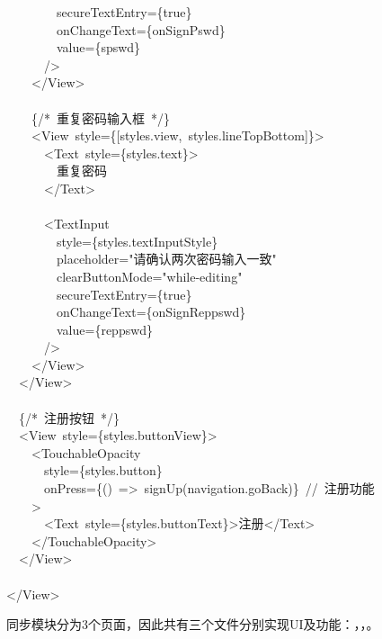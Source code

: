 \documentclass{article}
\begin{document}
\begin{mdpre}
~~~~~~~~secureTextEntry=\{{true}\}\\
~~~~~~~~onChangeText=\{onSignPswd\}\\
~~~~~~~~value=\{spswd\}\\
~~~~~~/\textgreater{}\\
~~~~\textless{}/View\textgreater{}\\
\\
~~~~\{{/*}{~重复密码输入框~}{*/}\}\\
~~~~\textless{}View~style=\{{}[styles.view,~styles.lineTopBottom]\}\textgreater{}\\
~~~~~~\textless{}Text~style=\{styles.text\}\textgreater{}\\
~~~~~~~~重复密码\\
~~~~~~\textless{}/Text\textgreater{}\\
\\
~~~~~~\textless{}TextInput\\
~~~~~~~~style=\{styles.textInputStyle\}\\
~~~~~~~~placeholder={"}{请确认两次密码输入一致}{"}\\
~~~~~~~~clearButtonMode={"}{while-editing}{"}\\
~~~~~~~~secureTextEntry=\{{true}\}\\
~~~~~~~~onChangeText=\{onSignReppswd\}\\
~~~~~~~~value=\{reppswd\}\\
~~~~~~/\textgreater{}\\
~~~~\textless{}/View\textgreater{}\\
~~\textless{}/View\textgreater{}\\
\\
~~\{{/*}{~注册按钮~}{*/}\}\\
~~\textless{}View~style=\{styles.buttonView\}\textgreater{}\\
~~~~\textless{}TouchableOpacity\\
~~~~~~style=\{styles.button\}\\
~~~~~~onPress=\{()~=\textgreater{}~signUp(navigation.goBack)\}~{//~注册功能}\\
~~~~\textgreater{}\\
~~~~~~\textless{}Text~style=\{styles.buttonText\}\textgreater{}注册\textless{}/Text\textgreater{}\\
~~~~\textless{}/TouchableOpacity\textgreater{}\\
~~\textless{}/View\textgreater{}\\
\\
\textless{}/View\textgreater{}%
\end{mdpre}\noindent{}同步模块分为3个页面，因此共有三个文件分别实现UI及功能：，，。
\end{document}
